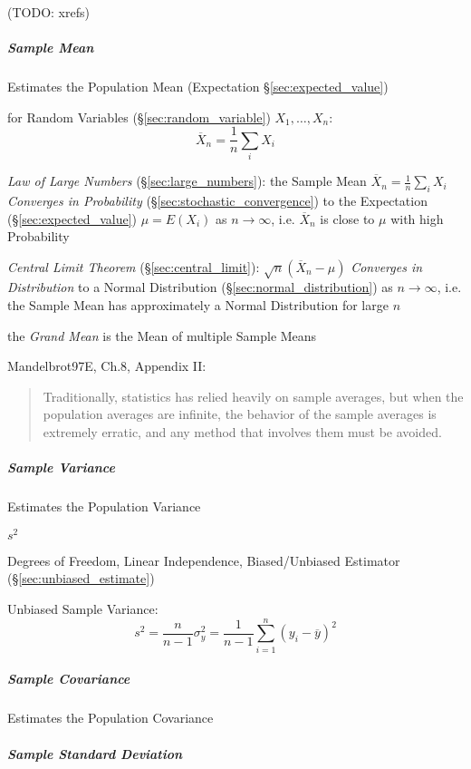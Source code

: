 (TODO: xrefs)



\subparagraph{Sample Mean}\label{sec:sample_mean}

Estimates the Population Mean (Expectation \S\ref{sec:expected_value})

for Random Variables (\S\ref{sec:random_variable}) $X_1, \ldots, X_n$:
\[
  \overline{X}_n = \frac{1}{n}\sum_i X_i
\]

\emph{Law of Large Numbers} (\S\ref{sec:large_numbers}): the Sample Mean
$\overline{X}_n = \frac{1}{n}\sum_i X_i$ \emph{Converges in Probability}
(\S\ref{sec:stochastic_convergence}) to the Expectation
(\S\ref{sec:expected_value}) $\mu = E(X_i)$ as $n \to \infty$, i.e.
$\overline{X}_n$ is close to $\mu$ with high Probability

\emph{Central Limit Theorem} (\S\ref{sec:central_limit}):
$\sqrt{n}(\overline{X}_n - \mu)$ \emph{Converges in Distribution} to a Normal
Distribution (\S\ref{sec:normal_distribution}) as $n \to \infty$, i.e.
the Sample Mean has approximately a Normal Distribution for large $n$

the \emph{Grand Mean} is the Mean of multiple Sample Means

Mandelbrot97E, Ch.8, Appendix II:
\begin{quote}
  Traditionally, statistics has relied heavily on sample averages, but when the
  population averages are infinite, the behavior of the sample averages is
  extremely erratic, and any method that involves them must be avoided.
\end{quote}



\subparagraph{Sample Variance}\label{sec:sample_variance}\hfill

Estimates the Population Variance

$s^2$

Degrees of Freedom, Linear Independence, Biased/Unbiased Estimator
(\S\ref{sec:unbiased_estimate})

Unbiased Sample Variance:
\[
  s^2 = \frac{n}{n-1}\sigma^2_y =
  \frac{1}{n-1} \sum_{i=1}^n (y_i - \overline{y})^2
\]



\subparagraph{Sample Covariance}\label{sec:sample_covariance}\hfill

Estimates the Population Covariance



\subparagraph{Sample Standard Deviation}
\label{sec:sample_standard_deviation}\hfill

